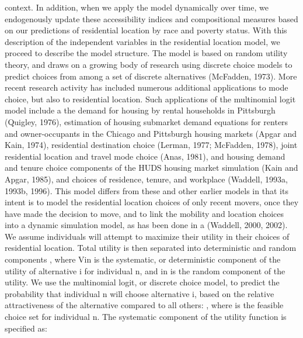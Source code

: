 \documentclass[12pt,a4paper]{article}
\begin{document}
context.  In addition, when we apply the model dynamically over
time, we endogenously update these accessibility indices and
compositional measures based on our predictions of residential
location by race and poverty status. With this description of the
independent variables in the residential location model, we
proceed to describe the model structure.  The model is based on
random utility theory, and draws on a growing body of research
using discrete choice models to predict choices from among a set
of discrete alternatives (McFadden, 1973).  More recent research
activity has included numerous additional applications to mode
choice, but also to residential location.  Such applications of
the multinomial logit model include a the demand for housing by
rental households in Pittsburgh (Quigley, 1976), estimation of
housing submarket demand equations for renters and owner-occupants
in the Chicago and Pittsburgh housing markets (Apgar and Kain,
1974), residential destination choice (Lerman, 1977; McFadden,
1978),  joint residential location and travel mode choice (Anas,
1981), and housing demand and tenure choice components of the HUDS
housing market simulation (Kain and Apgar, 1985), and choices of
residence, tenure, and workplace (Waddell, 1993a, 1993b, 1996).
This model differs from these and other earlier models in that its
intent is to model the residential location choices of only recent
movers, once they have made the decision to move, and to link the
mobility and location choices into a dynamic simulation model, as
has been done in a (Waddell, 2000, 2002). We assume individuals
will attempt to maximize their utility in their choices of
residential location.  Total utility is then separated into
deterministic and random components
 ,
where Vin is the systematic, or deterministic component of the
utility of alternative i for individual n, and  in is the random
component of the utility. We use the multinomial logit, or
discrete choice model, to predict the probability that individual
n will choose alternative i, based on the relative attractiveness
of the alternative compared to all others:
 ,
where   is the feasible choice set for individual n. The
systematic component of the utility function is specified as:
\end{document}
